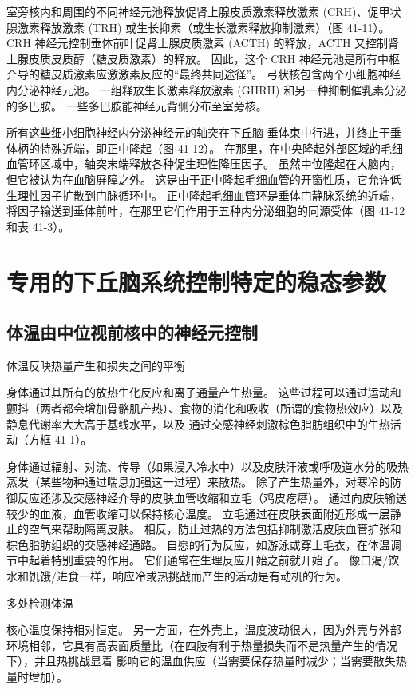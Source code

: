 室旁核内和周围的不同神经元池释放促肾上腺皮质激素释放激素 (CRH)、促甲状腺激素释放激素 (TRH) 或生长抑素（或生长激素释放抑制激素）（图 41-11）。 CRH 神经元控制垂体前叶促肾上腺皮质激素 (ACTH) 的释放，ACTH 又控制肾上腺皮质皮质醇（糖皮质激素）的释放。 因此，这个 CRH 神经元池是所有中枢介导的糖皮质激素应激激素反应的“最终共同途径”。 弓状核包含两个小细胞神经内分泌神经元池。 一组释放生长激素释放激素 (GHRH) 和另一种抑制催乳素分泌的多巴胺。 一些多巴胺能神经元背侧分布至室旁核。

所有这些细小细胞神经内分泌神经元的轴突在下丘脑-垂体束中行进，并终止于垂体柄的特殊近端，即正中隆起（图 41-12）。 在那里，在中央隆起外部区域的毛细血管环区域中，轴突末端释放各种促生理性降压因子。 虽然中位隆起在大脑内，但它被认为在血脑屏障之外。 这是由于正中隆起毛细血管的开窗性质，它允许低生理性因子扩散到门脉循环中。 正中隆起毛细血管环是垂体门静脉系统的近端，将因子输送到垂体前叶，在那里它们作用于五种内分泌细胞的同源受体（图 41-12 和表 41-3）。

\section{专用的下丘脑系统控制特定的稳态参数}
\subsection{体温由中位视前核中的神经元控制}
体温反映热量产生和损失之间的平衡

身体通过其所有的放热生化反应和离子通量产生热量。 这些过程可以通过运动和颤抖（两者都会增加骨骼肌产热）、食物的消化和吸收（所谓的食物热效应）以及静息代谢率大大高于基线水平，以及 通过交感神经刺激棕色脂肪组织中的生热活动（方框 41-1）。

身体通过辐射、对流、传导（如果浸入冷水中）以及皮肤汗液或呼吸道水分的吸热蒸发（某些物种通过喘息加强这一过程）来散热。 除了产生热量外，对寒冷的防御反应还涉及交感神经介导的皮肤血管收缩和立毛（鸡皮疙瘩）。 通过向皮肤输送较少的血液，血管收缩可以保持核心温度。 立毛通过在皮肤表面附近形成一层静止的空气来帮助隔离皮肤。 相反，防止过热的方法包括抑制激活皮肤血管扩张和棕色脂肪组织的交感神经通路。 自愿的行为反应，如游泳或穿上毛衣，在体温调节中起着特别重要的作用。 它们通常在生理反应开始之前就开始了。 像口渴/饮水和饥饿/进食一样，响应冷或热挑战而产生的活动是有动机的行为。

多处检测体温

核心温度保持相对恒定。 另一方面，在外壳上，温度波动很大，因为外壳与外部环境相邻，它具有高表面质量比（在四肢有利于热量损失而不是热量产生的情况下），并且热挑战显着 影响它的温血供应（当需要保存热量时减少；当需要散失热量时增加）。

